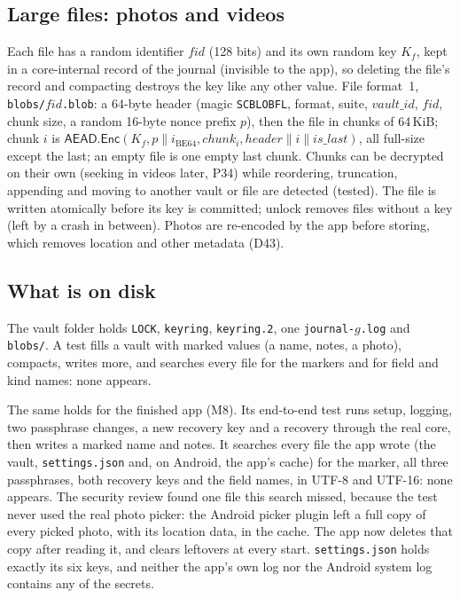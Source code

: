 \documentclass[11pt,a4paper]{article}
\newcommand{\concat}{\mathbin{\|}}
\newcommand{\AEAD}{\mathsf{AEAD}}
\newcommand{\Enc}{\mathsf{Enc}}
\newcommand{\dref}[1]{\textsf{#1}} %
\begin{document}
\subsection{Large files: photos and videos}
\label{sec:blobs}
Each file has a random identifier $\mathit{fid}$ (128 bits) and its own random key $K_f$, kept in a core-internal record of the journal (invisible to the app), so deleting the file's record and compacting destroys the key like any other value. File format~1, \texttt{blobs/}$\mathit{fid}$\texttt{.blob}: a 64-byte header (magic \texttt{SCBLOBFL}, format, suite, $\mathit{vault\_id}$, $\mathit{fid}$, chunk size, a random 16-byte nonce prefix $p$), then the file in chunks of 64\,KiB; chunk $i$ is $\AEAD.\Enc(K_f, p \concat i_{\mathrm{BE64}}, \mathit{chunk}_i, \mathit{header} \concat i \concat \mathit{is\_last})$, all full-size except the last; an empty file is one empty last chunk. Chunks can be decrypted on their own (seeking in videos later, \dref{P34}) while reordering, truncation, appending and moving to another vault or file are detected (tested). The file is written atomically before its key is committed; unlock removes files without a key (left by a crash in between). Photos are re-encoded by the app before storing, which removes location and other metadata (\dref{D43}).

\subsection{What is on disk}
\label{sec:ondisk}
The vault folder holds \texttt{LOCK}, \texttt{keyring}, \texttt{keyring.2}, one \texttt{journal-}$g$\texttt{.log} and \texttt{blobs/}. A test fills a vault with marked values (a name, notes, a photo), compacts, writes more, and searches every file for the markers and for field and kind names: none appears.

The same holds for the finished app (M8). Its end-to-end test runs setup, logging, two passphrase changes, a new recovery key and a recovery through the real core, then writes a marked name and notes. It searches every file the app wrote (the vault, \texttt{settings.json} and, on Android, the app's cache) for the marker, all three passphrases, both recovery keys and the field names, in UTF-8 and UTF-16: none appears. The security review found one file this search missed, because the test never used the real photo picker: the Android picker plugin left a full copy of every picked photo, with its location data, in the cache. The app now deletes that copy after reading it, and clears leftovers at every start. \texttt{settings.json} holds exactly its six keys, and neither the app's own log nor the Android system log contains any of the secrets.
\end{document}
